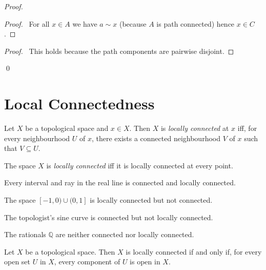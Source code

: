 \begin{proof}
\pf
{}
\begin{proof}
	\pf\ For all $x \in A$ we have $a \sim x$ (because $A$ is path connected) hence $x \in C$.
\end{proof}
\begin{proof}
	\pf\ This holds because the path components are pairwise disjoint.
\end{proof}
\qed
\end{proof}

\section{Local Connectedness}

\begin{df}
Let $X$ be a topological space and $x \in X$. Then $X$ is \emph{locally connected} at $x$ iff, for every neighbourhood $U$ of $x$, there exists a connected neighbourhood $V$ of $x$ such that $V \subseteq U$.

The space $X$ is \emph{locally connected} iff it is locally connected at every point.
\end{df}

\begin{ex}
Every interval and ray in the real line is connected and locally connected.
\end{ex}

\begin{ex}
The space $[-1,0) \cup (0,1]$ is locally connected but not connected.
\end{ex}

\begin{ex}
The topologist's sine curve is connected but not locally connected.
\end{ex}

\begin{ex}
The rationals $\mathbb{Q}$ are neither connected nor locally connected.
\end{ex}

\begin{thm}
Let $X$ be a topological space. Then $X$ is locally connected if and only if, for every open set $U$ in $X$, every component of $U$ is open in $X$.
\end{thm}

